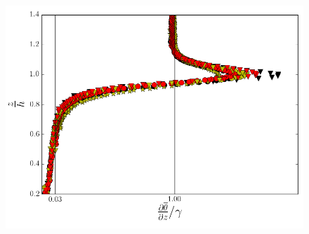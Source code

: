 \begin{figure}[htbp]
\begin{minipage}[b]{0.5\linewidth}
{                \includegraphics[scale=.3]{figures/scaled_theta_grad_profs}}\\      
        \\      
       

\end{minipage}
\end{figure}
